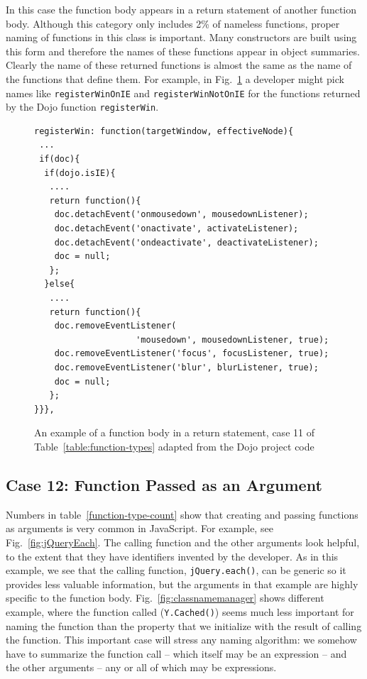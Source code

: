 \documentclass[10pt, preprint]{sigplanconf}
\begin{document}
In this case the function body appears in a return statement of another function body. Although this category only includes 2\% of nameless functions, proper naming of functions in this class is important. Many constructors are built using this form and therefore the names of these functions appear in object summaries.    Clearly the name of these returned functions is almost the same as the name of the functions that define them. For example, in Fig.~\ref{fig:registerWin} a developer might pick names like \verb|registerWinOnIE| and \verb|registerWinNotOnIE| for the functions returned by the Dojo function \verb|registerWin|.
\begin{figure}[htbp]

\lstset{basicstyle=\scriptsize}
\begin{lstlisting}[frame=single, language=myLang]
registerWin: function(targetWindow, effectiveNode){
 ...
 if(doc){
  if(dojo.isIE){
   ....
   return function(){
    doc.detachEvent('onmousedown', mousedownListener);
    doc.detachEvent('onactivate', activateListener);
    doc.detachEvent('ondeactivate', deactivateListener);
    doc = null;    
   };
  }else{
   ....
   return function(){
    doc.removeEventListener(
                    'mousedown', mousedownListener, true);
    doc.removeEventListener('focus', focusListener, true);
    doc.removeEventListener('blur', blurListener, true);
    doc = null;   
   };
}}},
\end{lstlisting}
\caption{An example of a function body in a return statement, case 11 of Table~\ref{table:function-types}  adapted from the Dojo project code}
\label{fig:registerWin}
\end{figure}

\subsection{Case 12: Function Passed as an Argument}
Numbers in table~\ref{function-type-count} show that creating and passing functions as arguments is very common in JavaScript.
For example, see Fig.~\ref{fig:jQueryEach}. The calling function and the other arguments look helpful, to the extent that they have identifiers invented by the developer. As in this example, we see that the calling function, \verb|jQuery.each()|, can be generic so it provides less valuable information, but the arguments in that example are highly specific to the function body.  Fig.~\ref{fig:classnamemanager} shows different example, where the function called (\verb|Y.Cached()|) seems much less important for naming the function than the property that we initialize with the result of calling the function.
This important case will stress any naming algorithm: we somehow have to summarize the function call -- which itself may be an expression -- and the other arguments -- any or all of which may be expressions. 
\end{document}
